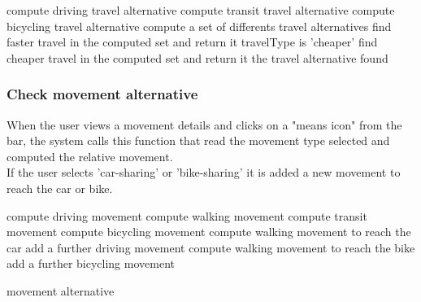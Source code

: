 \begin{algorithmic}

		
			\State 	compute driving travel alternative
			\State 	compute transit travel alternative
			\State 	compute bicycling travel alternative
			\State 	compute a set of differents travel alternatives
		\EndIf
				\State find faster travel in the computed set and return it
			\EndIf
			\If travelType is 'cheaper'
				\State find cheaper travel in the computed set and return it
			\EndIf
			\State \Return the travel alternative found
		\EndIf
	\EndFunction
\end{algorithmic}

\subsubsection{Check movement alternative}
When the user views a movement details and clicks on a "means icon" from the bar, the system calls this function that read the movement type selected and computed the relative movement.	
\\ If the user selects 'car-sharing' or 'bike-sharing' it is added a new movement to reach the car or bike.

\begin{algorithmic}
			\State compute driving movement
			\State compute walking movement
			\State compute transit movement
			\State compute bicycling movement
			\State compute walking movement to reach the car
			\State add a further driving movement
			\State compute walking movement to reach the bike
			\State add a further bicycling movement
		\EndIf
	
			\State \Return movement alternative
		\EndIf
	\EndFunction

\end{algorithmic}

